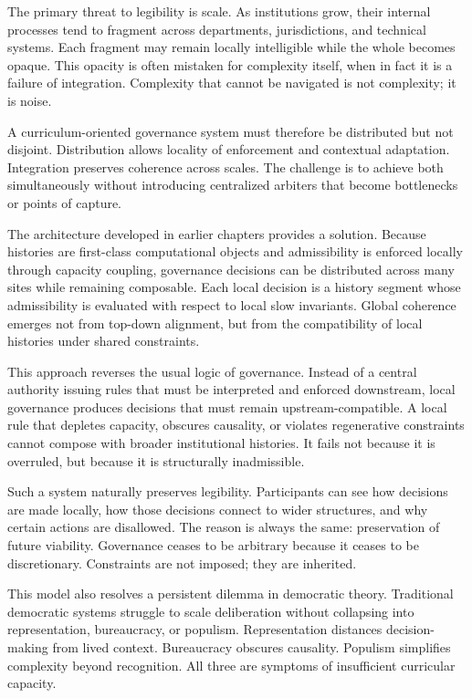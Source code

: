 \documentclass[12pt,oneside]{book}
\begin{document}
The primary threat to legibility is scale. As institutions grow, their internal processes tend to fragment across departments, jurisdictions, and technical systems. Each fragment may remain locally intelligible while the whole becomes opaque. This opacity is often mistaken for complexity itself, when in fact it is a failure of integration. Complexity that cannot be navigated is not complexity; it is noise.

A curriculum-oriented governance system must therefore be distributed but not disjoint. Distribution allows locality of enforcement and contextual adaptation. Integration preserves coherence across scales. The challenge is to achieve both simultaneously without introducing centralized arbiters that become bottlenecks or points of capture.

The architecture developed in earlier chapters provides a solution. Because histories are first-class computational objects and admissibility is enforced locally through capacity coupling, governance decisions can be distributed across many sites while remaining composable. Each local decision is a history segment whose admissibility is evaluated with respect to local slow invariants. Global coherence emerges not from top-down alignment, but from the compatibility of local histories under shared constraints.

This approach reverses the usual logic of governance. Instead of a central authority issuing rules that must be interpreted and enforced downstream, local governance produces decisions that must remain upstream-compatible. A local rule that depletes capacity, obscures causality, or violates regenerative constraints cannot compose with broader institutional histories. It fails not because it is overruled, but because it is structurally inadmissible.

Such a system naturally preserves legibility. Participants can see how decisions are made locally, how those decisions connect to wider structures, and why certain actions are disallowed. The reason is always the same: preservation of future viability. Governance ceases to be arbitrary because it ceases to be discretionary. Constraints are not imposed; they are inherited.

This model also resolves a persistent dilemma in democratic theory. Traditional democratic systems struggle to scale deliberation without collapsing into representation, bureaucracy, or populism. Representation distances decision-making from lived context. Bureaucracy obscures causality. Populism simplifies complexity beyond recognition. All three are symptoms of insufficient curricular capacity.
\end{document}
